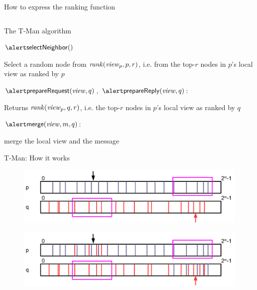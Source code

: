 \begin{frame}{How to express the ranking function}
\begin{columns}
\begin{column}{0.50\textwidth}
\end{column}
\end{columns}

\end{frame}

\begin{frame}{The T-Man algorithm}
	
\BI
\item $\SelectNeighbor()$
\BI
\item Select a random node from $\mathit{rank}(\mathit{view}_p, p, r)$, i.e. from
the top-$r$ nodes in $p$'s local view as ranked by $p$
\EI
\item $\ExtractRequest(\View, q)$, $\ExtractReply(\View, q)$:
\BI
\item Returns $\mathit{rank}(\mathit{view}_p, q, r)$, i.e. the top-$r$ nodes in $p$'s 
local view as ranked by $q$
\EI
\item $\Merge(\View, m, q)$:
\BI
\item merge the local view and the message
\EI
\EI
	
\end{frame}

\begin{frame}{T-Man: How it works}
	
\begin{overprint}
\begin{figure}	
	\includegraphics[width=\textwidth]{tman-1}
\end{figure}
\begin{figure}	
	\includegraphics[width=\textwidth]{tman-2}
\end{figure}
\end{overprint}

\end{frame}

